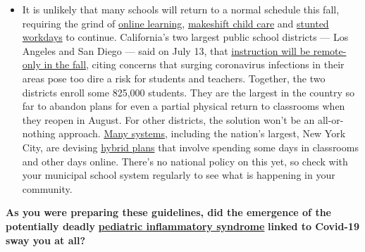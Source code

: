 \begin{itemize}
  \begin{itemize}
  \tightlist
  \item
    It is unlikely that many schools will return to a normal schedule
    this fall, requiring the grind of
    \href{https://www.nytimes.com/2020/06/05/us/coronavirus-education-lost-learning.html?action=click\&pgtype=Article\&state=default\&region=MAIN_CONTENT_3\&context=storylines_faq}{online
    learning},
    \href{https://www.nytimes.com/2020/05/29/us/coronavirus-child-care-centers.html?action=click\&pgtype=Article\&state=default\&region=MAIN_CONTENT_3\&context=storylines_faq}{makeshift
    child care} and
    \href{https://www.nytimes.com/2020/06/03/business/economy/coronavirus-working-women.html?action=click\&pgtype=Article\&state=default\&region=MAIN_CONTENT_3\&context=storylines_faq}{stunted
    workdays} to continue. California's two largest public school
    districts --- Los Angeles and San Diego --- said on July 13, that
    \href{https://www.nytimes.com/2020/07/13/us/lausd-san-diego-school-reopening.html?action=click\&pgtype=Article\&state=default\&region=MAIN_CONTENT_3\&context=storylines_faq}{instruction
    will be remote-only in the fall}, citing concerns that surging
    coronavirus infections in their areas pose too dire a risk for
    students and teachers. Together, the two districts enroll some
    825,000 students. They are the largest in the country so far to
    abandon plans for even a partial physical return to classrooms when
    they reopen in August. For other districts, the solution won't be an
    all-or-nothing approach.
    \href{https://bioethics.jhu.edu/research-and-outreach/projects/eschool-initiative/school-policy-tracker/}{Many
    systems}, including the nation's largest, New York City, are
    devising
    \href{https://www.nytimes.com/2020/06/26/us/coronavirus-schools-reopen-fall.html?action=click\&pgtype=Article\&state=default\&region=MAIN_CONTENT_3\&context=storylines_faq}{hybrid
    plans} that involve spending some days in classrooms and other days
    online. There's no national policy on this yet, so check with your
    municipal school system regularly to see what is happening in your
    community.
  \end{itemize}
\end{itemize}

\textbf{As you were preparing these guidelines, did the emergence of the
potentially deadly}
\textbf{\href{https://www.nytimes.com/2020/06/29/well/family/caring-for-children-with-multisystem-inflammatory-syndrome.html}{pediatric
inflammatory syndrome}} \textbf{linked to Covid-19 sway you at all?}

